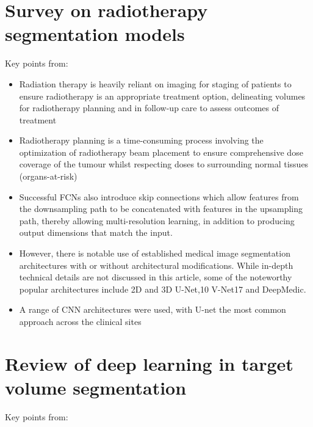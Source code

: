 \documentclass[11pt]{article}
\begin{document}


\tableofcontents

\clearpage

\section{Survey on radiotherapy segmentation models}

Key points from: \cite{Samarasinghe2021-ps}

\begin{itemize}
    \item Radiation therapy is heavily reliant on imaging for staging of patients to ensure radiotherapy is an appropriate treatment option, delineating volumes for radiotherapy planning and in follow-up care to assess outcomes of treatment
    \item Radiotherapy planning is a time-consuming process involving the optimization of radiotherapy beam placement to ensure comprehensive dose coverage of the tumour whilst respecting doses to surrounding normal tissues (organs-at-risk)
    \item Successful FCNs also introduce skip connections which allow features from the downsampling path to be concatenated with features in the upsampling path, thereby allowing multi-resolution learning, in addition to producing output dimensions that match the input.
    \item However, there is notable use of established medical image segmentation architectures with or without architectural modifications. While in-depth technical details are not discussed in this article, some of the noteworthy popular architectures include 2D and 3D U-Net,10 V-Net17 and DeepMedic.
    \item A range of CNN architectures were used, with U-net the most common approach across the clinical sites
\end{itemize}

\section{Review of deep learning in target volume segmentation}

Key points from: \cite{Lin2021-oz}
\end{document}
